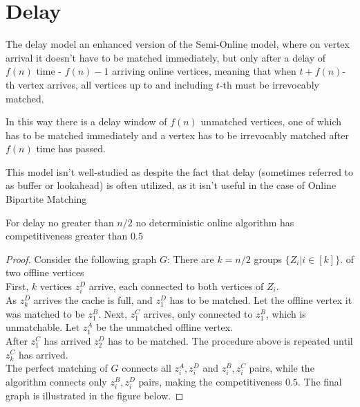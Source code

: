 \section{Delay}
\begin{definition}
	The delay model an enhanced version of the Semi-Online model, where on vertex arrival it doesn't have to be matched immediately, but only after a delay of $f(n)$ time - $f(n)-1$ arriving online vertices, meaning that when $t+f(n)$-th vertex arrives, all vertices up to and including $t$-th must be irrevocably matched.
\end{definition}

In this way there is a delay window of $f(n)$ unmatched vertices, one of which has to be matched immediately and a vertex has to be irrevocably matched after $f(n)$ time has passed.

This model isn't well-studied as despite the fact that delay (sometimes referred to as buffer or lookahead) is often utilized, as it isn't useful in the case of Online Bipartite Matching

\begin{theorem}
	For delay no greater than $n/2$ no deterministic online algorithm has competitiveness greater than $0.5$
\end{theorem}

\begin{proof}
	Consider the following graph $G$: There are $k=n/2$ groups $\{Z_i|i\in[k]\}$. of two offline vertices\\
	First, $k$ vertices $z_i^D$ arrive, each connected to both vertices of $Z_i$.\\
	As $z_k^D$ arrives the cache is full, and $z_1^D$ has to be matched. Let the offline vertex it was matched to be $z_1^B$. Next, $z_1^C$ arrives, only connected to $z_1^B$, which is unmatchable. Let $z_1^A$ be the unmatched offline vertex.\\
	After $z_1^C$ has arrived $z_2^D$ has to be matched. The procedure above is repeated until $z_k^C$ has arrived.\\
	The perfect matching of $G$ connects all $z_i^A,z_i^D$ and $z_i^B,z_i^C$ pairs, while the algorithm connects only $z_i^B,z_i^D$ pairs, making the competitiveness $0.5$. The final graph is illustrated in the figure below.
\end{proof}

\begin{figure}[H]
	\centering
	\scalebox{.8}{}
\end{figure}

